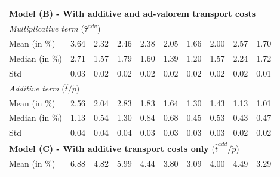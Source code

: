 \documentclass[11pt,twoside, authoryear]{elsarticle}
\begin{document}
\begin{table}[htbp]
{\begin{tabular}{l|c c c c c c c c c}
    \multicolumn{10}{l}{\textbf{Model (B) - With additive and ad-valorem transport costs}} \\ \hline
     \multicolumn{10}{l}{ \textit{Multiplicative term} ($\widehat{\tau}^{adv}$)} \\ \hline
    Mean (in \%) & \multicolumn{1}{c}{3.64} & \multicolumn{1}{c}{2.32} & \multicolumn{1}{c}{2.46} & \multicolumn{1}{c}{2.38} & \multicolumn{1}{c}{2.05} & \multicolumn{1}{c}{1.66} & \multicolumn{1}{c}{2.00} & \multicolumn{1}{c}{2.57} & \multicolumn{1}{c}{1.70} \\
    Median (in \%)& \multicolumn{1}{c}{2.71} & \multicolumn{1}{c}{1.57} & \multicolumn{1}{c}{1.79} & \multicolumn{1}{c}{1.60} & \multicolumn{1}{c}{1.39} & \multicolumn{1}{c}{1.20} & \multicolumn{1}{c}{1.57} & \multicolumn{1}{c}{2.24} & \multicolumn{1}{c}{1.72} \\
    Std & \multicolumn{1}{c}{0.03} & \multicolumn{1}{c}{0.02} & \multicolumn{1}{c}{0.02} & \multicolumn{1}{c}{0.02} & \multicolumn{1}{c}{0.02} & \multicolumn{1}{c}{0.02} & \multicolumn{1}{c}{0.02} & \multicolumn{1}{c}{0.02} & \multicolumn{1}{c}{0.01} \\ \hline
      \multicolumn{10}{l}{\textit{Additive term} ($\widehat{t}/\widetilde{p}$)} \\ \hline
    Mean (in \%) & \multicolumn{1}{c}{2.56} & \multicolumn{1}{c}{2.04} & \multicolumn{1}{c}{2.83} & \multicolumn{1}{c}{1.83} & \multicolumn{1}{c}{1.64} & \multicolumn{1}{c}{1.30} & \multicolumn{1}{c}{1.43} & \multicolumn{1}{c}{1.13} & \multicolumn{1}{c}{1.01} \\
    Median (in \%)& \multicolumn{1}{c}{1.13} & \multicolumn{1}{c}{0.54} & \multicolumn{1}{c}{1.30} & \multicolumn{1}{c}{0.84} & \multicolumn{1}{c}{0.68} & \multicolumn{1}{c}{0.45} & \multicolumn{1}{c}{0.53} & \multicolumn{1}{c}{0.43} & \multicolumn{1}{c}{0.47} \\
    Std & \multicolumn{1}{c}{0.04} & \multicolumn{1}{c}{0.04} & \multicolumn{1}{c}{0.04} & \multicolumn{1}{c}{0.03} & \multicolumn{1}{c}{0.03} & \multicolumn{1}{c}{0.03} & \multicolumn{1}{c}{0.03} & \multicolumn{1}{c}{0.02} & \multicolumn{1}{c}{0.02} \\ \hline
    \multicolumn{10}{l}{\textbf{Model (C) - With additive transport costs only} ($\widehat{t}^{add}/\widetilde{p}$)} \\ \hline
    Mean (in \%) & \multicolumn{1}{c}{6.88} & \multicolumn{1}{c}{4.82} & \multicolumn{1}{c}{5.99} & \multicolumn{1}{c}{4.44} & \multicolumn{1}{c}{3.80} & \multicolumn{1}{c}{3.09} & \multicolumn{1}{c}{4.00} & \multicolumn{1}{c}{4.49} & \multicolumn{1}{c}{3.29} \\

\end{tabular}}
\end{table}
\end{document}
